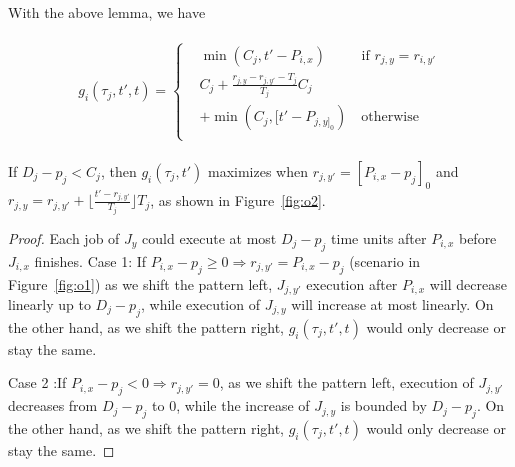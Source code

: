 With the above lemma, we have

	\begin{align}
	\begin{split}
	g_{i}(\tau_j,t',t)=
	\begin{cases}
	&\min(C_j, t'-P_{i,x})~\mbox{~~~~~~~if } r_{j,y}= r_{i,y'}\\
	&C_j+\frac{r_{j,y}-r_{j,y'}-T_j}{T_j}C_j\\&+\min(C_j, [t'-P_{j,y]_0})\mbox{~~~otherwise} \\
	\end{cases}
	\end{split}
	\end{align}

\begin{lemma}
If $D_j-p_j<C_j$, then $g_i(\tau_j,t')$ maximizes when $r_{j,y'}=[P_{i,x}-p_j]_0$ and  $r_{j,y}=r_{j,y'}+\lfloor \frac{t'-r_{j,y'}}{T_j}\rfloor T_j$, as shown in Figure~\ref{fig:o2}.
\end{lemma}
\begin{proof}
Each job of $J_y$ could execute at most $D_j-p_j$ time units after $P_{i,x}$ before $J_{i,x}$ finishes.
Case 1: If $P_{i,x}-p_j\geq 0\Rightarrow r_{j,y'}=P_{i,x}-p_j$ (scenario in Figure~\ref{fig:o1}) as we shift the pattern left, $J_{j,y'}$ execution after $P_{i,x}$ will decrease linearly up to $D_j-p_j$, while  execution of $J_{j,y}$  will increase at most linearly. On the other hand, as we shift the pattern right, $g_i(\tau_j,t',t)$  would only decrease or stay the same.

Case 2 :If $P_{i,x}-p_j<0\Rightarrow r_{j,y'}=0$, as we shift the pattern left, execution of $J_{j,y'}$ decreases from $D_j-p_j$ to 0, while the increase of $J_{j,y}$ is bounded by $D_j-p_j$. On the other hand, as we shift the pattern right, $g_i(\tau_j,t',t)$  would only decrease or stay the same.
\end{proof}


